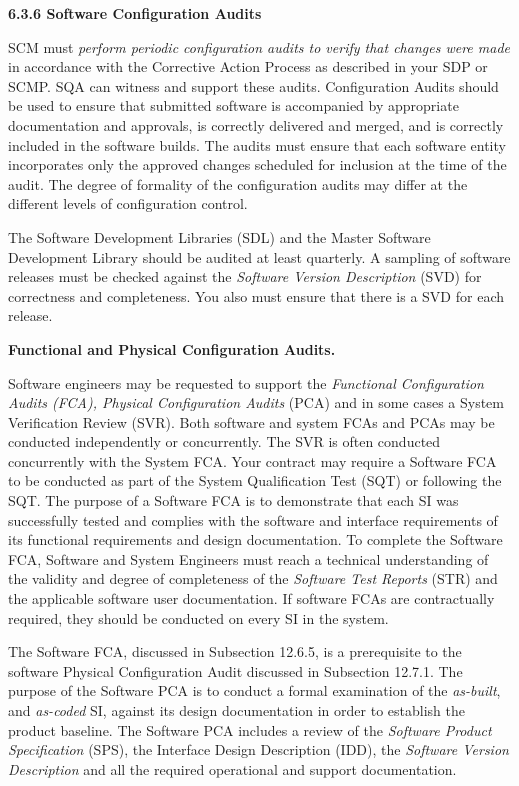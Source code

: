 \documentclass[8pt,twocolumn]{amsart}
\theoremstyle{plain}
\begin{document}
{\bf 6.3.6 Software Configuration Audits}

SCM must {\em perform periodic configuration audits to verify that changes were made} in accordance with the Corrective Action Process as described in your SDP or SCMP. SQA can witness and support these audits. Configuration Audits should be used to ensure that submitted software is accompanied by appropriate documentation and approvals, is correctly delivered and merged, and is correctly included in the software builds. The audits must ensure that each software entity incorporates only the approved changes scheduled for inclusion at the time of the audit. The degree of formality of the configuration audits may differ at the different levels of configuration control.

The Software Development Libraries (SDL) and the Master Software Development Library should be audited at least quarterly. A sampling of software releases must be checked against the {\em Software Version Description} (SVD) for correctness and completeness. You also must ensure that there is a SVD for each release. 

{\bf Functional and Physical Configuration Audits.}

Software engineers may be requested to support the {\em Functional Configuration Audits (FCA), Physical Configuration Audits} (PCA) and in some cases a System Verification Review (SVR). Both software and system FCAs and PCAs may be conducted independently or concurrently. The SVR is often conducted concurrently with the System FCA. Your contract may require a Software FCA to be conducted as part of the System Qualification Test (SQT) or following the SQT. The purpose of a Software FCA is to demonstrate that each SI was successfully tested and complies with the software and interface requirements of its functional requirements
and design documentation. To complete the Software FCA, Software and System Engineers must reach a technical understanding of the validity and degree of completeness of the {\em Software Test Reports} (STR) and the applicable software user documentation. If software FCAs are contractually required, they should be conducted on every SI in the system.

The Software FCA, discussed in Subsection 12.6.5, is a prerequisite to the software Physical Configuration Audit discussed in Subsection 12.7.1. The purpose of the Software PCA is to conduct a formal examination of the {\em as-built}, and {\em as-coded} SI, against its design documentation in order to establish the product baseline. The Software PCA includes a review of the {\em Software Product Specification} (SPS), the Interface Design Description (IDD), the {\em Software Version Description} and all the required operational and support documentation.
\end{document}
